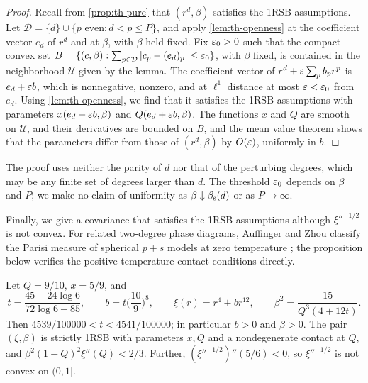 \begin{proof}
Recall from \cref{prop:th-pure} that $(r^d,\beta)$ satisfies the 1RSB assumptions. Let $\mathcal D=\{d\}\cup\{p\text{ even}:d<p\le P\}$, and apply \cref{lem:th-openness} at the coefficient vector $e_d$ of $r^d$ and at $\beta$, with $\beta$ held fixed. Fix $\varepsilon_0>0$ such that the compact convex set $B=\{(c,\beta):\sum_{p\in\mathcal D}\left|c_p-(e_d)_p\right|\le\varepsilon_0\}$, with $\beta$ fixed, is contained in the neighborhood $\mathcal U$ given by the lemma. The coefficient vector of $r^d+\varepsilon\sum_pb_pr^p$ is $e_d+\varepsilon b$, which is nonnegative, nonzero, and at $\ell^1$ distance at most $\varepsilon<\varepsilon_0$ from $e_d$. Using \cref{lem:th-openness}, we find that it satisfies the 1RSB assumptions with parameters $x(e_d+\varepsilon b,\beta)$ and $Q(e_d+\varepsilon b,\beta)$. The functions $x$ and $Q$ are smooth on $\mathcal U$, and their derivatives are bounded on $B$, and the mean value theorem shows that the parameters differ from those of $(r^d,\beta)$ by $O(\varepsilon)$, uniformly in $b$.
\end{proof}

The proof uses neither the parity of $d$ nor that of the perturbing degrees, which may be any finite set of degrees larger than $d$. The threshold $\varepsilon_0$ depends on $\beta$ and $P$; we make no claim of uniformity as $\beta\downarrow\beta_{\mathrm s}(d)$ or as $P\to\infty$.

Finally, we give a covariance that satisfies the 1RSB assumptions although $\xi''^{-1/2}$ is not convex. For related two-degree phase diagrams, Auffinger and Zhou classify the Parisi measure of spherical $p+s$ models at zero temperature \cite[Theorems~2--4]{AuffingerZhou2025}; the proposition below verifies the positive-temperature contact conditions directly.

\begin{proposition}\label{prop:th-example}
Let $Q=9/10$, $x=5/9$, and
\begin{equation}\label{eq:th-example-constants}
t=\frac{45-24\log6}{72\log6-85},\qquad b=t\Big(\frac{10}9\Big)^8,\qquad\xi(r)=r^4+br^{12},\qquad\beta^2=\frac{15}{Q^3(4+12t)}.
\end{equation}
Then $4539/100000<t<4541/100000$; in particular $b>0$ and $\beta>0$. The pair $(\xi,\beta)$ is strictly 1RSB with parameters $x,Q$ and a nondegenerate contact at $Q$, and $\beta^2(1-Q)^2\xi''(Q)<2/3$. Further, $(\xi''^{-1/2})''(5/6)<0$, so $\xi''^{-1/2}$ is not convex on $(0,1]$.
\end{proposition}

